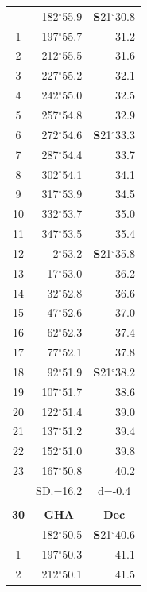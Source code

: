 \documentclass[10pt, a4paper]{report}
\begin{document}
\begin{scriptsize}
\begin{tabular*}{0.2\textwidth}[t]{@{\extracolsep{\fill}}|c|rr|}
\hline\rule{0pt}{2.6ex}\noindent
0 & 182$^\circ$55.9 & \textbf{S}21$^\circ$30.8\\
1 & 197$^\circ$55.7 & 31.2\\
2 & 212$^\circ$55.5 & 31.6\\
3 & 227$^\circ$55.2 & \raisebox{0.24ex}{\boldmath$\cdot$~\boldmath$\cdot$~~}32.1\\
4 & 242$^\circ$55.0 & 32.5\\
5 & 257$^\circ$54.8 & 32.9\\[2Pt]
6 & 272$^\circ$54.6 & \textbf{S}21$^\circ$33.3\\
7 & 287$^\circ$54.4 & 33.7\\
8 & 302$^\circ$54.1 & 34.1\\
9 & 317$^\circ$53.9 & \raisebox{0.24ex}{\boldmath$\cdot$~\boldmath$\cdot$~~}34.5\\
10 & 332$^\circ$53.7 & 35.0\\
11 & 347$^\circ$53.5 & 35.4\\[2Pt]
12 & 2$^\circ$53.2 & \textbf{S}21$^\circ$35.8\\
13 & 17$^\circ$53.0 & 36.2\\
14 & 32$^\circ$52.8 & 36.6\\
15 & 47$^\circ$52.6 & \raisebox{0.24ex}{\boldmath$\cdot$~\boldmath$\cdot$~~}37.0\\
16 & 62$^\circ$52.3 & 37.4\\
17 & 77$^\circ$52.1 & 37.8\\[2Pt]
18 & 92$^\circ$51.9 & \textbf{S}21$^\circ$38.2\\
19 & 107$^\circ$51.7 & 38.6\\
20 & 122$^\circ$51.4 & 39.0\\
21 & 137$^\circ$51.2 & \raisebox{0.24ex}{\boldmath$\cdot$~\boldmath$\cdot$~~}39.4\\
22 & 152$^\circ$51.0 & 39.8\\
23 & 167$^\circ$50.8 & 40.2\\
\hline
\rule{0pt}{2.4ex} & \multicolumn{1}{c}{SD.=16.2} & \multicolumn{1}{c|}{d=-0.4}\\
\hline
\multicolumn{1}{c}{}\\[-0.5ex]\hline
\multicolumn{1}{|c|}{\rule{0pt}{2.6ex}\textbf{30}} & \multicolumn{1}{c}{\textbf{GHA}} & \multicolumn{1}{c|}{\textbf{Dec}}\\
\hline\rule{0pt}{2.6ex}\noindent
0 & 182$^\circ$50.5 & \textbf{S}21$^\circ$40.6\\
1 & 197$^\circ$50.3 & 41.1\\
2 & 212$^\circ$50.1 & 41.5\\

\end{tabular*}
\end{scriptsize}
\end{document}
